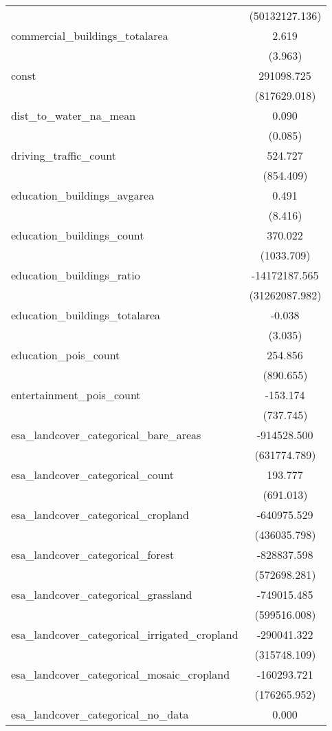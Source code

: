 \begin{table}[!htbp]
\begin{tabular}{@{\extracolsep{5pt}}lc}
  & (50132127.136) \\
 commercial_buildings_totalarea & 2.619$^{}$ \\
  & (3.963) \\
 const & 291098.725$^{}$ \\
  & (817629.018) \\
 dist_to_water_na_mean & 0.090$^{}$ \\
  & (0.085) \\
 driving_traffic_count & 524.727$^{}$ \\
  & (854.409) \\
 education_buildings_avgarea & 0.491$^{}$ \\
  & (8.416) \\
 education_buildings_count & 370.022$^{}$ \\
  & (1033.709) \\
 education_buildings_ratio & -14172187.565$^{}$ \\
  & (31262087.982) \\
 education_buildings_totalarea & -0.038$^{}$ \\
  & (3.035) \\
 education_pois_count & 254.856$^{}$ \\
  & (890.655) \\
 entertainment_pois_count & -153.174$^{}$ \\
  & (737.745) \\
 esa_landcover_categorical_bare_areas & -914528.500$^{}$ \\
  & (631774.789) \\
 esa_landcover_categorical_count & 193.777$^{}$ \\
  & (691.013) \\
 esa_landcover_categorical_cropland & -640975.529$^{}$ \\
  & (436035.798) \\
 esa_landcover_categorical_forest & -828837.598$^{}$ \\
  & (572698.281) \\
 esa_landcover_categorical_grassland & -749015.485$^{}$ \\
  & (599516.008) \\
 esa_landcover_categorical_irrigated_cropland & -290041.322$^{}$ \\
  & (315748.109) \\
 esa_landcover_categorical_mosaic_cropland & -160293.721$^{}$ \\
  & (176265.952) \\
 esa_landcover_categorical_no_data & 0.000$^{}$ \\

\end{tabular}
\end{table}
